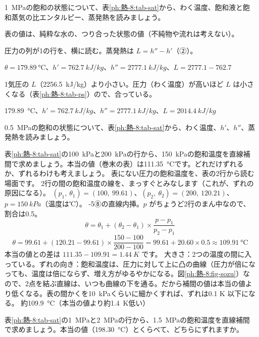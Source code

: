 \begin{reidai}[蒸気表を読む]
\label{ph:熱-8:ex2}\qty{1}{MPa}の飽和の状態について、表\ref{ph:熱-8:tab-sat}から、わく温度、飽和液と飽和蒸気の比エンタルピー、蒸発熱を読みましょう。
\par{} 表の値は、純粋な水の、つり合った状態の値（不純物や流れは考えない）。
\par\kangaekata 圧力の列が1の行を、横に読む。蒸発熱は $L=h''-h'$（②）。
\par\shiki $\theta=\qty{179.89}{\celsius}$、$h'=\qty{762.7}{kJ/kg}$、$h''=\qty{2777.1}{kJ/kg}$、$L=2777.1-762.7$
\par{} 1気圧の $L$（\qty{2256.5}{kJ/kg}）より小さい。圧力（わく温度）が高いほど $L$ は小さくなる（表\ref{ph:熱-8:tab-ps}）ので、合っている。
\par\kotae \qty{179.89}{\celsius}、$h'=\qty{762.7}{kJ/kg}$、$h''=\qty{2777.1}{kJ/kg}$、$L=\qty{2014.4}{kJ/kg}$
\end{reidai}
\begin{jibun}
\qty{0.5}{MPa}の飽和の状態について、表\ref{ph:熱-8:tab-sat}から、わく温度、$h'$、$h''$、蒸発熱を読みましょう。
\end{jibun}

\begin{phreidai}
\label{ph:熱-8:ex3}表\ref{ph:熱-8:tab-sat}の\qty{100}{kPa}と\qty{200}{kPa}の行から、\qty{150}{kPa}の飽和温度を直線補間で求めましょう。本当の値（巻末の表）は\qty{111.35}{\celsius}です。どれだけずれるか、ずれるわけも考えましょう。
\phbamen
表にない圧力の飽和温度を、表の2行から読む場面です。
\phmushi
2行の間の飽和温度の線を、まっすぐとみなします（これが、ずれの原因になる）。
\phzu
$(p_1,\ \theta_1)=(100,\ 99.61)$、$(p_2,\ \theta_2)=(200,\ 120.21)$、$p=\qty{150}{kPa}$（温度は℃）。
-5⑧の直線内挿。$p$ がちょうど2行のまん中なので、割合は0.5。
\phtateru
\[ \theta=\theta_1+(\theta_2-\theta_1)\times\frac{p-p_1}{p_2-p_1} \]
\phtoku
\[ \theta=99.61+(120.21-99.61)\times\frac{150-100}{200-100}=99.61+20.60\times0.5\approx\qty{109.91}{\celsius} \]
本当の値との差は $111.35-109.91=\qty{1.44}{K}$ です。
\phtashikame
大きさ：2つの温度の間に入っている。ずれの向き：飽和温度は、圧力に対して上に凸の曲線（圧力が倍になっても、温度は倍にならず、増え方がゆるやかになる。図\ref{ph:熱-8:fig-sozu}）なので、2点を結ぶ直線は、いつも曲線の下を通る。だから補間の値は本当の値より低くなる。表の間かくを\qty{10}{kPa}くらいに細かくすれば、ずれは0.1 K 以下になる。
\kotae 約\qty{109.9}{\celsius}（本当の値より約\qty{1.4}{K}低い）
\end{phreidai}
\begin{jibun}
表\ref{ph:熱-8:tab-sat}の\qty{1}{MPa}と\qty{2}{MPa}の行から、\qty{1.5}{MPa}の飽和温度を直線補間で求めましょう。本当の値（\qty{198.30}{\celsius}）とくらべて、どちらにずれますか。
\end{jibun}

